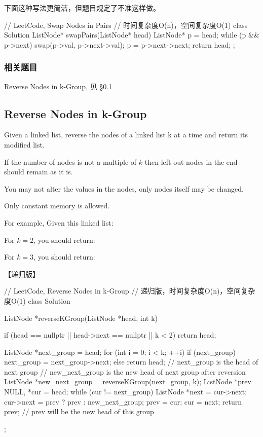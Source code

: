 下面这种写法更简洁，但题目规定了不准这样做。
\begin{Code}
	// LeetCode, Swap Nodes in Pairs
	// 时间复杂度O(n)，空间复杂度O(1)
	class Solution {
		ListNode* swapPairs(ListNode* head) {
			ListNode* p = head;
			while (p && p->next) {
				swap(p->val, p->next->val);
				p = p->next->next;
			}
			return head;
		}
	};
\end{Code}

\subsubsection{相关题目}

\begindot
\item Reverse Nodes in k-Group, 见 \S \ref{sec:reverse-nodes-in-k-group}
\myenddot


\subsection{Reverse Nodes in k-Group}
\label{sec:reverse-nodes-in-k-group}



Given a linked list, reverse the nodes of a linked list k at a time and return
its modified list.

If the number of nodes is not a multiple of $k$ then left-out nodes in the end
should remain as it is.

You may not alter the values in the nodes, only nodes itself may be changed.

Only constant memory is allowed.

For example,
Given this linked list: 

For $k = 2$, you should return: 

For $k = 3$, you should return: 

【递归版】
\begin{Code}
	// LeetCode, Reverse Nodes in k-Group
	// 递归版，时间复杂度O(n)，空间复杂度O(1)
	class Solution {
		ListNode *reverseKGroup(ListNode *head, int k) {
			if (head == nullptr || head->next == nullptr || k < 2)
				return head;
			
			ListNode *next_group = head;
			for (int i = 0; i < k; ++i) {
				if (next_group)
					next_group = next_group->next;
				else
					return head;
			}
			// next_group is the head of next group
			// new_next_group is the new head of next group after reversion
			ListNode *new_next_group = reverseKGroup(next_group, k);
			ListNode *prev = NULL, *cur = head;
			while (cur != next_group) {
				ListNode *next = cur->next;
				cur->next = prev ? prev : new_next_group;
				prev = cur;
				cur = next;
			}
			return prev; // prev will be the new head of this group
		}
	};
\end{Code}



